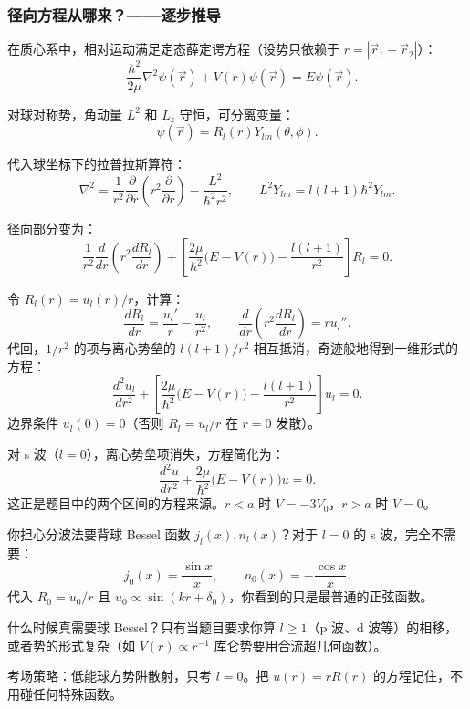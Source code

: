 \begin{derivationbox}[s 波分波法与相移]
\subsubsection*{径向方程从哪来？——逐步推导}

在质心系中，相对运动满足定态薛定谔方程（设势只依赖于 $r = |\vec{r}_1 - \vec{r}_2|$）：
\[
-\frac{\hbar^2}{2\mu}\nabla^2 \psi(\vec{r}) + V(r)\psi(\vec{r}) = E\psi(\vec{r}).
\]

对球对称势，角动量 $L^2$ 和 $L_z$ 守恒，可分离变量：
\[
\psi(\vec{r}) = R_l(r) Y_{lm}(\theta, \phi).
\]

代入球坐标下的拉普拉斯算符：
\[
\nabla^2 = \frac{1}{r^2}\frac{\partial}{\partial r}\left(r^2 \frac{\partial}{\partial r}\right) - \frac{L^2}{\hbar^2 r^2}, \qquad L^2 Y_{lm} = l(l+1)\hbar^2 Y_{lm}.
\]

径向部分变为：
\[
\frac{1}{r^2}\frac{d}{dr}\left(r^2 \frac{dR_l}{dr}\right) + \left[ \frac{2\mu}{\hbar^2}\bigl(E - V(r)\bigr) - \frac{l(l+1)}{r^2} \right] R_l = 0.
\]

令 $R_l(r) = u_l(r)/r$，计算：
\[
\frac{dR_l}{dr} = \frac{u_l'}{r} - \frac{u_l}{r^2}, \qquad \frac{d}{dr}\left(r^2 \frac{dR_l}{dr}\right) = r u_l''.
\]
代回，$1/r^2$ 的项与离心势垒的 $l(l+1)/r^2$ 相互抵消，奇迹般地得到一维形式的方程：
\[
\frac{d^2 u_l}{dr^2} + \left[ \frac{2\mu}{\hbar^2}\bigl(E - V(r)\bigr) - \frac{l(l+1)}{r^2} \right] u_l = 0.
\]
边界条件 $u_l(0) = 0$（否则 $R_l = u_l/r$ 在 $r = 0$ 发散）。

对 s 波（$l = 0$），离心势垒项消失，方程简化为：
\[
\frac{d^2 u}{dr^2} + \frac{2\mu}{\hbar^2}\bigl(E - V(r)\bigr) u = 0.
\]
这正是题目中的两个区间的方程来源。$r < a$ 时 $V = -3V_0$，$r > a$ 时 $V = 0$。
\end{derivationbox}

\begin{tipbox}
你担心分波法要背球 Bessel 函数 $j_l(x), n_l(x)$？对于 $l = 0$ 的 s 波，完全不需要：
\[
j_0(x) = \frac{\sin x}{x}, \qquad n_0(x) = -\frac{\cos x}{x}.
\]
代入 $R_0 = u_0/r$ 且 $u_0 \propto \sin(kr + \delta_0)$，你看到的只是最普通的正弦函数。

什么时候真需要球 Bessel？只有当题目要求你算 $l \ge 1$（p 波、d 波等）的相移，或者势的形式复杂（如 $V(r) \propto r^{-1}$ 库仑势要用合流超几何函数）。

考场策略：低能球方势阱散射，只考 $l = 0$。把 $u(r) = rR(r)$ 的方程记住，不用碰任何特殊函数。
\end{tipbox}

